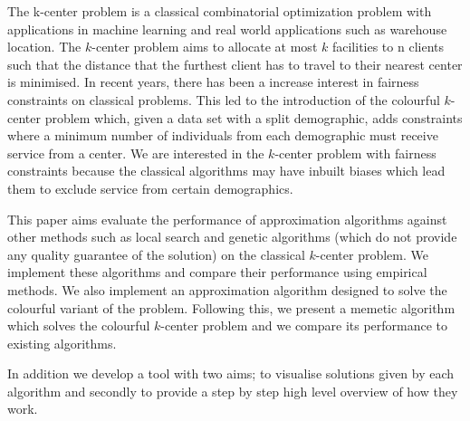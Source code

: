 The k-center problem is a classical combinatorial optimization problem with applications in machine learning and real world applications such as warehouse location. The $k$-center problem aims to allocate at most $k$ facilities to n clients such that the distance that the furthest client has to travel to their nearest center is minimised. In recent years, there has been a increase interest in fairness constraints on classical problems. This led to the introduction of the colourful $k$-center problem which, given a data set with a split demographic, adds constraints where a minimum number of individuals from each demographic must receive service from a center. We are interested in the $k$-center problem with fairness constraints because the classical algorithms may have inbuilt biases which lead them to exclude service from certain demographics.

This paper aims evaluate the performance of approximation algorithms against other methods such as local search and genetic algorithms (which do not provide any quality guarantee of the solution) on the classical $k$-center problem. We implement these algorithms and compare their performance using empirical methods. We also implement an approximation algorithm designed to solve the colourful variant of the problem. Following this, we present a memetic algorithm which solves the colourful $k$-center problem and we compare its performance to existing algorithms.

In addition we develop a tool with two aims; to visualise solutions given by each algorithm and secondly to provide a step by step high level overview of how they work.